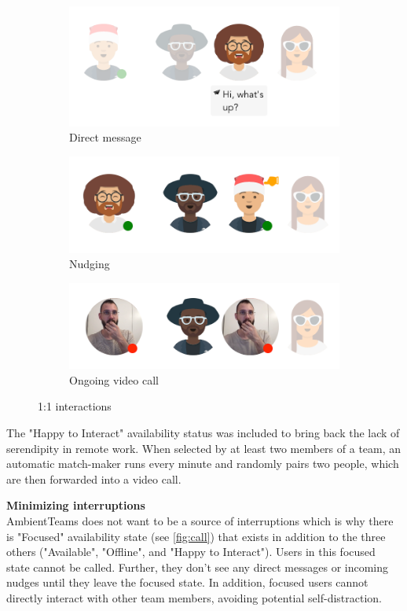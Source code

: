 \begin{figure}[h]
    \centering
    \begin{subfigure}{.3\textwidth}
        \centering
        \includegraphics[width=.9\linewidth]{./images/DM.png}
        \caption{Direct message }
        \label{fig:dm}
    \end{subfigure}%
    \begin{subfigure}{.3\textwidth}
        \centering
        \includegraphics[width=.9\linewidth]{./images/nudging.png}
        \caption{Nudging }
        \label{fig:nudging}
    \end{subfigure}
    \begin{subfigure}{.3\textwidth}
        \centering
        \includegraphics[width=.9\linewidth]{./images/call.png}
        \caption{Ongoing video call }
        \label{fig:call}
    \end{subfigure}
    \caption{1:1 interactions}
    \label{fig:interaction_results}
\end{figure}

The "Happy to Interact" availability status was included to bring back the lack of serendipity in remote work. When selected by at least two members of a team, an automatic match-maker runs every minute and randomly pairs two people, which are then forwarded into a video call.

\medskip\noindent\textbf{Minimizing interruptions} \\
AmbientTeams does not want to be a source of interruptions which is why there is "Focused" availability state (see \autoref{fig:call}) that exists in addition to the three others ("Available", "Offline", and "Happy to Interact"). Users in this focused state cannot be called. Further, they don't see any direct messages or incoming nudges until they leave the focused state. In addition, focused users cannot directly interact with other team members, avoiding potential self-distraction.